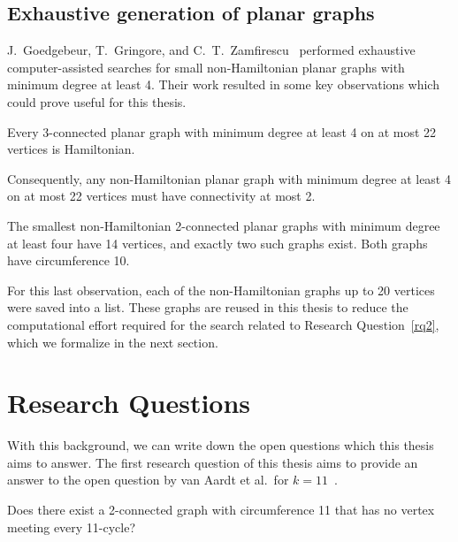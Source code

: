 \subsection{Exhaustive generation of planar graphs}

J.\ Goedgebeur, T.\ Gringore, and C.\ T.\ Zamfirescu~\cite{article:hamiltonian-planar} performed exhaustive com\-puter-assisted searches for small non-Hamiltonian planar graphs with minimum degree at least 4. Their work resulted in some key observations which could prove useful for this thesis.

\begin{observation}
  \label{obs:3con-hamiltonian}
  Every 3-connected planar graph with minimum degree at least 4 on at most 22 vertices is Hamiltonian.
\end{observation}

Consequently, any non-Hamiltonian planar graph with minimum degree at least 4 on at most 22 vertices must have connectivity at most 2.

\begin{observation}
  \label{obs:2con-n14}
  The smallest non-Hamiltonian 2-connected planar graphs with minimum degree at least four have 14 vertices, and exactly two such graphs exist. Both graphs have circumference 10.
\end{observation}

For this last observation, each of the non-Hamiltonian graphs up to 20 vertices were saved into a list. These graphs are reused in this thesis to reduce the computational effort required for the search related to Research Question~\ref{rq2}, which we formalize in the next section.

\section{Research Questions}
\label{sec:rq}

With this background, we can write down the open questions which this thesis aims to answer. The first research question of this thesis aims to provide an answer to the open question by van Aardt et al.\ for $k=11$~\cite{article:van-aardt}.

\begin{researchquestion}
\label{rq1}
Does there exist a 2-connected graph with circumference 11
that has no vertex meeting every 11-cycle?
\cite{article:van-aardt}
\end{researchquestion}

